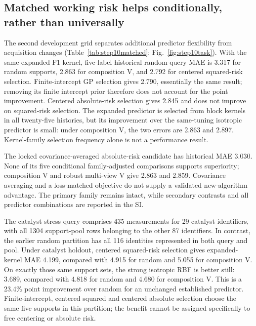\subsection{Matched working risk helps conditionally, rather than universally}
The second development grid separates additional predictor flexibility from acquisition changes (Table~\ref{tab:step10matched}; Fig.~\ref{fig:step10task}). With the same expanded F1 kernel, five-label historical random-query MAE is 3.317 for random supports, 2.863 for composition V, and 2.792 for centered squared-risk selection. Finite-intercept GP selection gives 2.790, essentially the same result; removing its finite intercept prior therefore does not account for the point improvement. Centered absolute-risk selection gives 2.845 and does not improve on squared-risk selection. The expanded predictor is selected from block kernels in all twenty-five histories, but its improvement over the same-tuning isotropic predictor is small: under composition V, the two errors are 2.863 and 2.897. Kernel-family selection frequency alone is not a performance result.

The locked covariance-averaged absolute-risk candidate has historical MAE 3.030. None of its five conditional family-adjusted comparisons supports superiority; composition V and robust multi-view V give 2.863 and 2.859. Covariance averaging and a loss-matched objective do not supply a validated new-algorithm advantage. The primary family remains intact, while secondary contrasts and all predictor combinations are reported in the SI.



The catalyst stress query comprises 435 measurements for 29 catalyst identifiers, with all 1304 support-pool rows belonging to the other 87 identifiers. In contrast, the earlier random partition has all 116 identities represented in both query and pool. Under catalyst holdout, centered squared-risk selection gives expanded-kernel MAE 4.199, compared with 4.915 for random and 5.055 for composition V. On exactly those same support sets, the strong isotropic RBF is better still: 3.689, compared with 4.818 for random and 4.680 for composition V. This is a 23.4\% point improvement over random for an unchanged established predictor. Finite-intercept, centered squared and centered absolute selection choose the same five supports in this partition; the benefit cannot be assigned specifically to free centering or absolute risk.

